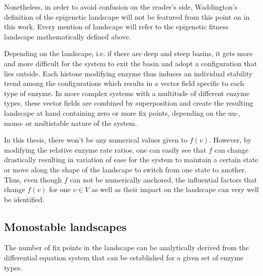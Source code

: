             Nonetheless, in order to avoid confusion on the reader's side, Waddington's definition of the epigenetic landscape will not be featured from this point on in this work. Every mention of landscape will refer to the epigenetic fitness landscape mathematically defined above.

            Depending on the landscape, i.e. if there are deep and steep basins, it gets more and more difficult for the system to exit the basin and adopt a configuration that lies outside. Each histone modifying enzyme thus induces an individual stability trend among the configurations which results in a vector field specific to each type of enzyme. In more complex systems with a multitude of different enzyme types, these vector fields are combined by superposition and create the resulting landscape at hand containing zero or more fix points, depending on the un-, mono- or multistable nature of the system.

            In this thesis,  there won't be any numerical values given to $f(v)$. However, by modifying the relative enzyme rate ratios, one can easily see that $f$ can change drastically resulting in variation of ease for the system to maintain a certain state or move along the shape of the landscape to switch from one state to another. Thus, even though $f$ can not be numerically anchored, the influential factors that change $f(v)$ for one $v \in V$ as well as their impact on the landscape can very well be identified.
        \subsection{Monostable landscapes}
        \label{subsec:monostability}
            The number of fix points in the landscape can be analytically derived from the differential equation system that can be established for a given set of enzyme types.

